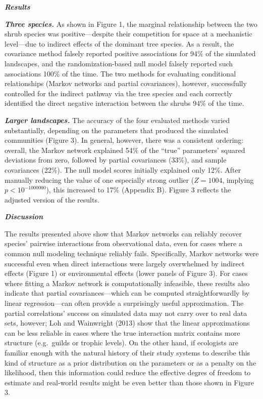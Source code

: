 \documentclass[12pt,]{article}
\begin{document}
\begin{spacing}{1.9}
\begin{flushleft}
\textbf{\emph{Results}}

\textbf{\emph{Three species.}} As shown in Figure 1, the marginal
relationship between the two shrub species was positive---despite their
competition for space at a mechanistic level---due to indirect effects
of the dominant tree species. As a result, the covariance method falsely
reported positive associations for 94\% of the simulated landscapes, and
the randomization-based null model falsely reported such associations
100\% of the time. The two methods for evaluating conditional
relationships (Markov networks and partial covariances), however,
successfully controlled for the indirect pathway via the tree species
and each correctly identified the direct negative interaction between
the shrubs 94\% of the time.

\textbf{\emph{Larger landscapes.}} The accuracy of the four evaluated
methods varied substantially, depending on the parameters that produced
the simulated communities (Figure 3). In general, however, there was a
consistent ordering: overall, the Markov network explained 54\% of the
``true'' parameters' squared deviations from zero, followed by partial
covariances (33\%), and sample covariances (22\%). The null model scores
initially explained only 12\%. After manually reducing the value of one
especially strong outlier (\(Z=1004\), implying \(p<10^{-1000000}\)),
this increased to 17\% (Appendix B). Figure 3 reflects the adjusted
version of the results.

\textbf{\emph{Discussion}}

The results presented above show that Markov networks can reliably
recover species' pairwise interactions from observational data, even for
cases where a common null modeling technique reliably fails.
Specifically, Markov networks were successful even when direct
interactions were largely overwhelmed by indirect effects (Figure 1) or
environmental effects (lower panels of Figure 3). For cases where
fitting a Markov network is computationally infeasible, these results
also indicate that partial covariances---which can be computed
straightforwardly by linear regression---can often provide a
surprisingly useful approximation. The partial correlations' success on
simulated data may not carry over to real data sets, however; Loh and
Wainwright (2013) show that the linear approximations can be less
reliable in cases where the true interaction matrix contains more
structure (e.g.~guilds or trophic levels). On the other hand, if
ecologists are familiar enough with the natural history of their study
systems to describe this kind of structure as a prior distribution on
the parameters or as a penalty on the likelihood, then this information
could reduce the effective degres of freedom to estimate and real-world
results might be even better than those shown in Figure 3.


\end{flushleft}
\end{spacing}
\end{document}
